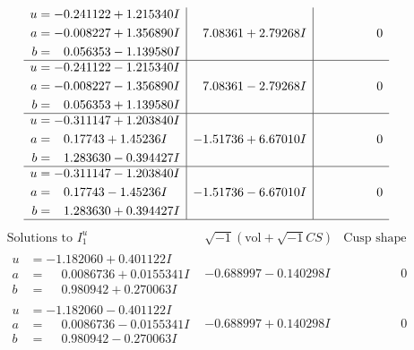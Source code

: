 \documentclass[1p]{elsarticle_modified}
\theoremstyle{definition}
\newcommand{\I}{\sqrt{-1}}
\begin{document}
$$\begin{array}{c|c|c}
\begin{aligned}
u &= -0.241122 + 1.215340 I \\
a &= -0.008227 + 1.356890 I \\
b &= \phantom{-}0.056353 - 1.139580 I\end{aligned}
 & \phantom{-}7.08361 + 2.79268 I & \phantom{-0.000000 } 0 \\ \hline\begin{aligned}
u &= -0.241122 - 1.215340 I \\
a &= -0.008227 - 1.356890 I \\
b &= \phantom{-}0.056353 + 1.139580 I\end{aligned}
 & \phantom{-}7.08361 - 2.79268 I & \phantom{-0.000000 } 0 \\ \hline\begin{aligned}
u &= -0.311147 + 1.203840 I \\
a &= \phantom{-}0.17743 + 1.45236 I \\
b &= \phantom{-}1.283630 - 0.394427 I\end{aligned}
 & -1.51736 + 6.67010 I & \phantom{-0.000000 } 0 \\ \hline\begin{aligned}
u &= -0.311147 - 1.203840 I \\
a &= \phantom{-}0.17743 - 1.45236 I \\
b &= \phantom{-}1.283630 + 0.394427 I\end{aligned}
 & -1.51736 - 6.67010 I & \phantom{-0.000000 } 0\\
 \hline 
 \end{array}$$\newpage$$\begin{array}{c|c|c}  
\text{Solutions to }I^u_{1}& \I (\text{vol} + \sqrt{-1}CS) & \text{Cusp shape}\\
 \hline 
\begin{aligned}
u &= -1.182060 + 0.401122 I \\
a &= \phantom{-}0.0086736 + 0.0155341 I \\
b &= \phantom{-}0.980942 + 0.270063 I\end{aligned}
 & -0.688997 - 0.140298 I & \phantom{-0.000000 } 0 \\ \hline\begin{aligned}
u &= -1.182060 - 0.401122 I \\
a &= \phantom{-}0.0086736 - 0.0155341 I \\
b &= \phantom{-}0.980942 - 0.270063 I\end{aligned}
 & -0.688997 + 0.140298 I & \phantom{-0.000000 } 0 \\ \hline\begin{aligned}

\end{aligned}
\end{array}$$
\end{document}
